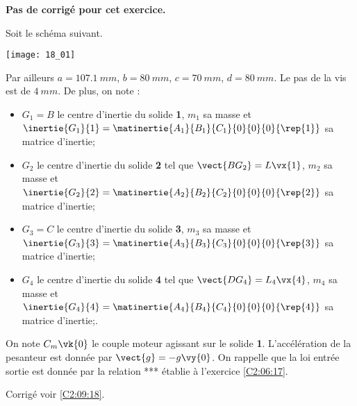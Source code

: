 \normalfalse \difficilefalse \tdifficiletrue
\correctionfalse


\setcounter{numques}{0}
\ifcorrection
\else
\textbf{Pas de corrigé pour cet exercice.}
\fi

\ifprof
\else

Soit le schéma suivant. 
\begin{center}
\texttt{[image: 18\_01]}
\end{center}


Par ailleurs $a=\SI{107,1}{mm}$, $b=\SI{80}{mm}$, $c=\SI{70}{mm}$, $d=\SI{80}{mm}$. Le pas de la vis est de $\SI{4}{mm}$. De plus, on note :
\begin{itemize}
\item $G_1=B$ le centre d'inertie du solide \textbf{1}, $m_1$ sa masse et $\inertie{G_1}{1}=\matinertie{A_1}{B_1}{C_1}{0}{0}{0}{\rep{1}}$ sa matrice d'inertie;
\item $G_2$ le centre d'inertie du solide \textbf{2} tel que $\vect{BG_2}=L\vx{1}$, $m_2$ sa masse et $\inertie{G_2}{2}=\matinertie{A_2}{B_2}{C_2}{0}{0}{0}{\rep{2}}$ sa matrice d'inertie;
\item $G_3=C$ le centre d'inertie du solide \textbf{3}, $m_3$ sa masse et $\inertie{G_3}{3}=\matinertie{A_3}{B_3}{C_3}{0}{0}{0}{\rep{3}}$ sa matrice d'inertie;
\item $G_4$ le centre d'inertie du solide \textbf{4} tel que $\vect{DG_4}=L_4\vx{4}$, $m_4$ sa masse et $\inertie{G_4}{4}=\matinertie{A_4}{B_4}{C_4}{0}{0}{0}{\rep{4}}$ sa matrice d'inertie;.
\end{itemize}
On note $C_m\vk{0}$ le couple moteur agissant sur le solide \textbf{1}. L'accélération de la pesanteur est donnée par $\vect{g}=-g\vy{0}$.
On rappelle que la loi entrée sortie est donnée par la relation *** établie à l'exercice \ref{C2:06:17}.

\fi

\ifprof
\else
\fi

\ifprof
\else
\fi

\ifprof
\else
\fi

\ifprof
\else
\fi

\ifprof
\else
\fi

\ifprof
\else
\begin{flushright}
\footnotesize{Corrigé  voir \ref{C2:09:18}.}
\end{flushright}%
\fi